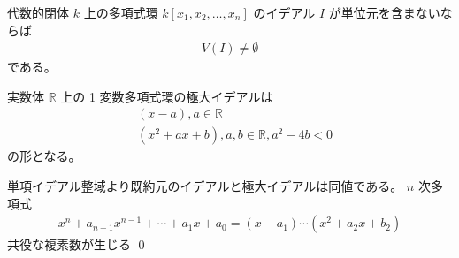 \documentclass[uplatex,dvipdfmx,a4paper,11pt]{jlreq}
\makeatletter
\newcommand{\RR}{\mathbb{R}}
\numberwithin{equation}{section}
\theoremstyle{definition}
\renewenvironment{proof}[1][\proofname]{\par
  \normalfont
  \topsep6\p@\@plus6\p@ \trivlist
  \item[\hskip\labelsep{\bfseries #1}\@addpunct{\bfseries}]\ignorespaces\quad\par
}{%
  \qed\endtrivlist\@endpefalse
}
\renewcommand\proofname{証明}
\makeatother
\begin{document}
\begin{theorem}
  代数的閉体 $k$ 上の多項式環 $k[x_1, x_2,\ldots,x_n]$ のイデアル $I$ が単位元を含まないならば
  \begin{align}
    V(I)\neq\emptyset
  \end{align}
  である。
\end{theorem}

\begin{proposition}
  実数体 $\RR$ 上の 1 変数多項式環の極大イデアルは
  \begin{align}
     & (x - a), a\in\RR                        \\
     & (x^2 + ax + b), a,b\in\RR, a^2 - 4b < 0
  \end{align}
  の形となる。
\end{proposition}
\begin{proof}
  単項イデアル整域より既約元のイデアルと極大イデアルは同値である。
  $n$ 次多項式
  \begin{align}
    x^n + a_{n-1}x^{n-1} + \cdots + a_1x + a_0 = (x - a_1)\cdots(x^2 + a_2x + b_2)
  \end{align}
  共役な複素数が生じる
\end{proof}
\end{document}
